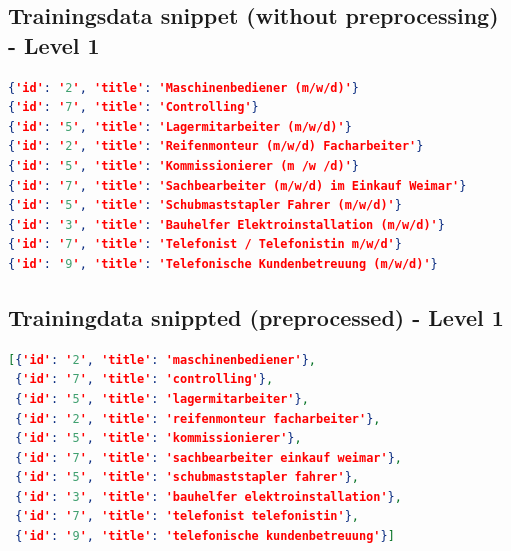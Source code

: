 \documentclass[12pt, a4paper, titlepage]{article}
\begin{document}
\subsection{Trainingsdata snippet (without preprocessing) - Level 1}
\begin{lstlisting}[language=json, firstnumber=1]
{'id': '2', 'title': 'Maschinenbediener (m/w/d)'}
{'id': '7', 'title': 'Controlling'}
{'id': '5', 'title': 'Lagermitarbeiter (m/w/d)'}
{'id': '2', 'title': 'Reifenmonteur (m/w/d) Facharbeiter'}
{'id': '5', 'title': 'Kommissionierer (m /w /d)'}
{'id': '7', 'title': 'Sachbearbeiter (m/w/d) im Einkauf Weimar'}
{'id': '5', 'title': 'Schubmaststapler Fahrer (m/w/d)'}
{'id': '3', 'title': 'Bauhelfer Elektroinstallation (m/w/d)'}
{'id': '7', 'title': 'Telefonist / Telefonistin m/w/d'}
{'id': '9', 'title': 'Telefonische Kundenbetreuung (m/w/d)'}
\end{lstlisting}


\subsection{Trainingdata snippted (preprocessed) - Level 1}
\begin{lstlisting}[language=json, firstnumber=1]
[{'id': '2', 'title': 'maschinenbediener'},
 {'id': '7', 'title': 'controlling'},
 {'id': '5', 'title': 'lagermitarbeiter'},
 {'id': '2', 'title': 'reifenmonteur facharbeiter'},
 {'id': '5', 'title': 'kommissionierer'},
 {'id': '7', 'title': 'sachbearbeiter einkauf weimar'},
 {'id': '5', 'title': 'schubmaststapler fahrer'},
 {'id': '3', 'title': 'bauhelfer elektroinstallation'},
 {'id': '7', 'title': 'telefonist telefonistin'},
 {'id': '9', 'title': 'telefonische kundenbetreuung'}]
\end{lstlisting}
\end{document}
